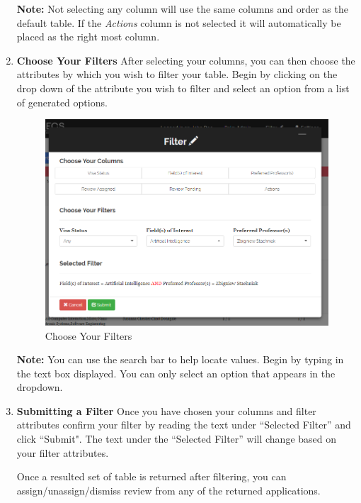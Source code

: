 \documentclass[fontsize=12pt,paper=letter,twoside]{scrartcl}
\begin{document}
\begin{enumerate}
\smallskip
\noindent \textbf{Note:} Not selecting any column will use the same columns and order as the default table. If the \emph{Actions} column is not selected it will automatically be placed as the right most column.

\clearpage
\item \textbf{Choose Your Filters} After selecting your columns, you can then choose the attributes by which you wish to filter your table. Begin by clicking on the drop down of the attribute you wish to filter and select an option from a list of generated options.

\begin{figure}[!htb]
\begin{center}
\includegraphics[width=.99\textwidth]{images/adm/mr/selected_filter.png}
\end{center}
\caption{Choose Your Filters}
\label{fig:adm/choose_filters}
\end{figure} 

\smallskip
\noindent \textbf{Note:} You can use the search bar to help locate values. Begin by typing in the text box displayed. You can only select an option that appears in the dropdown.

\clearpage
\item \textbf{Submitting a Filter} Once you have chosen your columns and filter attributes confirm your filter by reading the text under ``Selected Filter'' and click ``Submit". The text under the ``Selected Filter'' will change based on your filter attributes.

\bigskip
\noindent Once a resulted set of table is returned after filtering, you can assign/unassign/dismiss review from any of the returned applications.


\end{enumerate}
\end{document}
